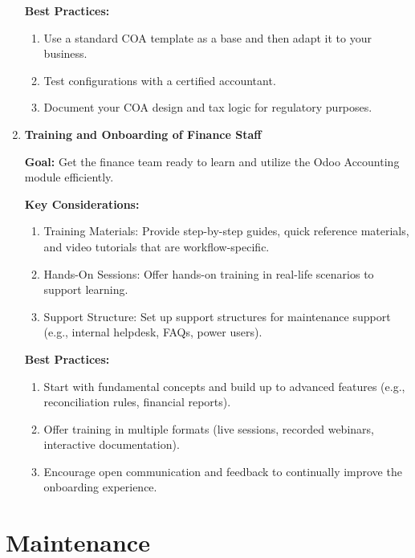 \documentclass[11pt,a4paper]{article}
\begin{document}
\begin{enumerate}
    \textbf{Best Practices:}
    \begin{enumerate}
        \item Use a standard COA template as a base and then adapt it to your business.
        \item Test configurations with a certified accountant.
        \item Document your COA design and tax logic for regulatory purposes.
    \end{enumerate}
    \medskip

    \item \textbf{Training and Onboarding of Finance Staff}

    \textbf{Goal:} Get the finance team ready to learn and utilize the Odoo Accounting module efficiently.
    \medskip

    \textbf{Key Considerations:}
    \begin{enumerate}
        \item Training Materials: Provide step-by-step guides, quick reference materials, and video tutorials that are workflow-specific.
        \item Hands-On Sessions: Offer hands-on training in real-life scenarios to support learning.
        \item Support Structure: Set up support structures for maintenance support (e.g., internal helpdesk, FAQs, power users).
    \end{enumerate}
    \medskip

    \textbf{Best Practices:}
    \begin{enumerate}
        \item Start with fundamental concepts and build up to advanced features (e.g., reconciliation rules, financial reports).
        \item Offer training in multiple formats (live sessions, recorded webinars, interactive documentation).
        \item Encourage open communication and feedback to continually improve the onboarding experience.
    \end{enumerate}
    
\end{enumerate}

\newpage
\section{Maintenance}
\end{document}
